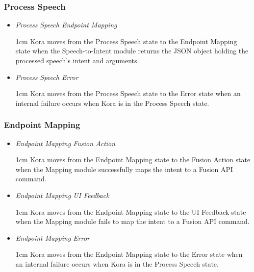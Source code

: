 \documentclass[onecolumn, draftclsnofoot,10pt, compsoc]{IEEEtran}
\def \botname{Kora\xspace}
\newenvironment{indentItem}[1][1cm]{\begin{adjustwidth}{#1}{}}{\end{adjustwidth}}
\begin{document}
	\subsubsection{Process Speech}
	\begin{itemize}
		\item \textit{Process Speech \textrightarrow{} Endpoint Mapping}
		\begin{indentItem}
			\botname moves from the Process Speech state to the Endpoint Mapping state when the Speech-to-Intent module returns the JSON object holding the processed speech's intent and arguments.
		\end{indentItem}
		\item \textit{Process Speech \textrightarrow{} Error}
		\begin{indentItem}
			\botname moves from the Process Speech state to the Error state when an internal failure occurs when \botname is in the Process Speech state.
		\end{indentItem}
	\end{itemize}

	\subsubsection{Endpoint Mapping}
	\begin{itemize}
		\item \textit{Endpoint Mapping \textrightarrow{} Fusion Action}
		\begin{indentItem}
			\botname moves from the Endpoint Mapping state to the Fusion Action state when the Mapping module successfully maps the intent to a Fusion API command.
		\end{indentItem}
		\item \textit{Endpoint Mapping \textrightarrow{} UI Feedback}
		\begin{indentItem}
			\botname moves from the Endpoint Mapping state to the UI Feedback state when the Mapping module fails to map the intent to a Fusion API command.
		\end{indentItem}
		\item \textit{Endpoint Mapping \textrightarrow{} Error}
		\begin{indentItem}
			\botname moves from the Endpoint Mapping state to the Error state when an internal failure occurs when \botname is in the Process Speech state.
		\end{indentItem}
	\end{itemize}
\end{document}
